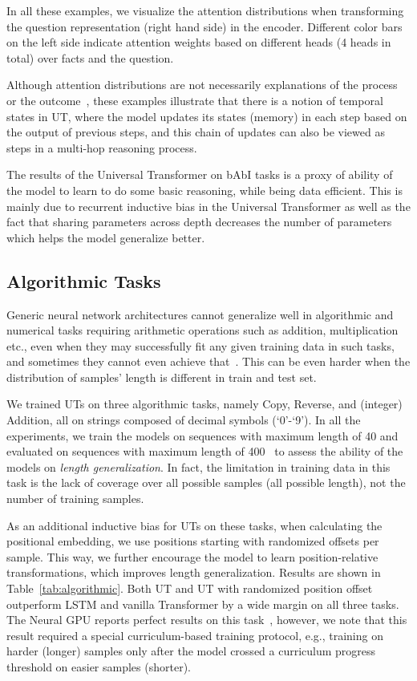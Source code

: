 In all these examples, we visualize the attention distributions when transforming the question representation (right hand side) in the encoder. Different color bars on the left side indicate attention weights based on different heads (4 heads in total) over facts and the question.

Although attention distributions are not necessarily explanations of the process or the outcome~\citep{attentionisnotexplnation}, these examples illustrate that there is a notion of temporal states in UT, where the model updates its states (memory) in each step based on the output of previous steps, and this chain of updates can also be viewed as steps in a multi-hop reasoning process. 


The results of the Universal Transformer on bAbI tasks is a proxy of ability of the model to learn to do some basic reasoning, while being data efficient.  
This is mainly due to recurrent inductive bias in the Universal Transformer as well as the fact that sharing parameters across depth decreases the number of parameters which helps the model generalize better.



\subsection{Algorithmic Tasks}
Generic neural network architectures cannot generalize well in algorithmic and numerical tasks requiring arithmetic operations such as addition, multiplication etc., even when they may successfully fit any given training data in such tasks, and sometimes they cannot even achieve that~\citep{trask2018neural}. This can be even harder when the distribution of samples' length is different in train and test set.

We trained UTs on three algorithmic tasks, namely Copy, Reverse, and (integer) Addition, all on strings composed of decimal symbols (`0'-`9'). In all the experiments, we train the models on sequences with maximum length of 40 and evaluated on sequences with maximum length of 400~\citep{neural_gpu} to assess the ability of the models on \emph{length generalization}. In fact, the limitation in training data in this task is the lack of coverage over all possible samples (all possible length), not the number of training samples.

As an additional inductive bias for UTs on these tasks, when calculating the positional embedding, we use positions starting with randomized offsets per sample. This way, we further encourage the model to learn position-relative transformations, which improves length generalization.
Results are shown in Table~\ref{tab:algorithmic}. Both UT and UT with randomized position offset outperform LSTM and vanilla Transformer by a wide margin on all three tasks. 
The Neural GPU reports perfect results on this task~\citep{neural_gpu}, however, we note that this result required a special curriculum-based training protocol, e.g., training on harder (longer) samples only after the model crossed a curriculum progress threshold on easier samples (shorter). 

